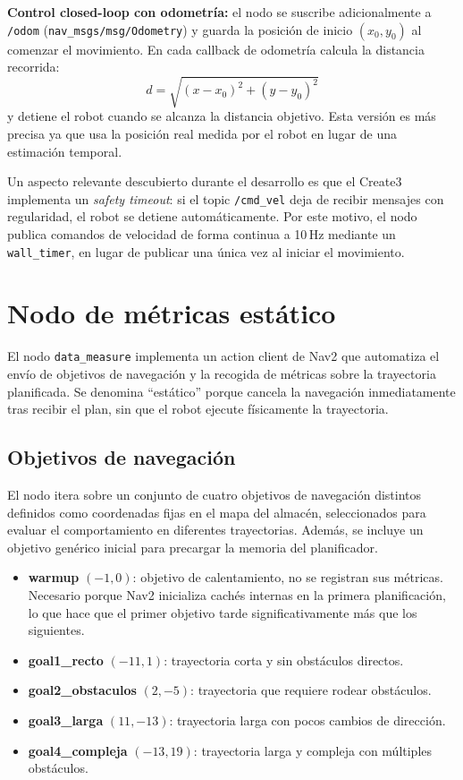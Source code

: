 \textbf{Control closed-loop con odometría:} el nodo se suscribe adicionalmente a \texttt{/odom} (\texttt{nav\_msgs/msg/Odometry}) y guarda la posición de inicio $(x_0, y_0)$ al comenzar el movimiento. En cada callback de odometría calcula la distancia recorrida:
\[ d = \sqrt{(x - x_0)^2 + (y - y_0)^2} \]
y detiene el robot cuando se alcanza la distancia objetivo. Esta versión es más precisa ya que usa la posición real medida por el robot en lugar de una estimación temporal.

Un aspecto relevante descubierto durante el desarrollo es que el Create3 implementa un \textit{safety timeout}: si el topic \texttt{/cmd\_vel} deja de recibir mensajes con regularidad, el robot se detiene automáticamente. Por este motivo, el nodo publica comandos de velocidad de forma continua a 10\,Hz mediante un \texttt{wall\_timer}, en lugar de publicar una única vez al iniciar el movimiento.

\section{Nodo de métricas estático}

El nodo \texttt{data\_measure} implementa un action client de Nav2 que automatiza el envío de objetivos de navegación y la recogida de métricas sobre la trayectoria planificada. Se denomina ``estático'' porque cancela la navegación inmediatamente tras recibir el plan, sin que el robot ejecute físicamente la trayectoria.

\subsection{Objetivos de navegación}

El nodo itera sobre un conjunto de cuatro objetivos de navegación distintos definidos como coordenadas fijas en el mapa del almacén, seleccionados para evaluar el comportamiento en diferentes trayectorias. Además, se incluye un objetivo genérico inicial para precargar la memoria del planificador.

\begin{itemize}
    \item \textbf{warmup} $(-1, 0)$: objetivo de calentamiento, no se registran sus métricas. Necesario porque Nav2 inicializa cachés internas en la primera planificación, lo que hace que el primer objetivo tarde significativamente más que los siguientes.
    \item \textbf{goal1\_recto} $(-11, 1)$: trayectoria corta y sin obstáculos directos.
    \item \textbf{goal2\_obstaculos} $(2, -5)$: trayectoria que requiere rodear obstáculos.
    \item \textbf{goal3\_larga} $(11, -13)$: trayectoria larga con pocos cambios de dirección.
    \item \textbf{goal4\_compleja} $(-13, 19)$: trayectoria larga y compleja con múltiples obstáculos.
\end{itemize}

